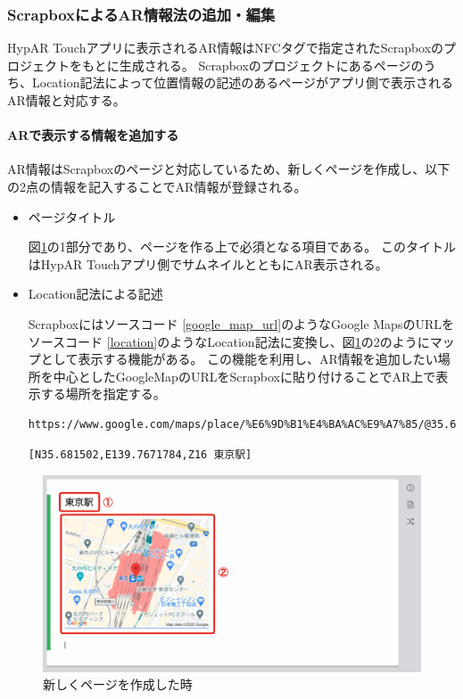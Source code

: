 \subsubsection{ScrapboxによるAR情報法の追加・編集}
HypAR Touchアプリに表示されるAR情報はNFCタグで指定されたScrapboxのプロジェクトをもとに生成される。
Scrapboxのプロジェクトにあるページのうち、Location記法によって位置情報の記述のあるページがアプリ側で表示されるAR情報と対応する。

\paragraph*{ARで表示する情報を追加する}
AR情報はScrapboxのページと対応しているため、新しくページを作成し、以下の2点の情報を記入することでAR情報が登録される。
\begin{itemize}
  \item ページタイトル
  
  図\ref{fig:scrapbox_ar_new}の\textcircled{\scriptsize{1}}部分であり、ページを作る上で必須となる項目である。
  このタイトルはHypAR Touchアプリ側でサムネイルとともにAR表示される。

  \item Location記法による記述
  
  Scrapboxにはソースコード \ref{google_map_url}のようなGoogle MapsのURLをソースコード \ref{location}のようなLocation記法に変換し、図\ref{fig:scrapbox_ar_new}の\textcircled{\scriptsize{2}}のようにマップとして表示する機能がある。
  この機能を利用し、AR情報を追加したい場所を中心としたGoogleMapのURLをScrapboxに貼り付けることでAR上で表示する場所を指定する。

  \begin{lstlisting}[caption=googleMapのURL, label=google_map_url]
    https://www.google.com/maps/place/%E6%9D%B1%E4%BA%AC%E9%A7%85/@35.681502,139.7671784,17z/data=!4m5!3m4!1s0x60188bfbd89f700b:0x277c49ba34ed38!8m2!3d35.6812362!4d139.7671248
  \end{lstlisting}

  \begin{lstlisting}[caption=Location記法, label=location]
    [N35.681502,E139.7671784,Z16 東京駅]
  \end{lstlisting}
\end{itemize}

\begin{figure}[H]
  \centering
  \includegraphics[width=120mm]{images/scrapbox_ar_new.png}
  \caption{新しくページを作成した時} \label{fig:scrapbox_ar_new}
\end{figure}

